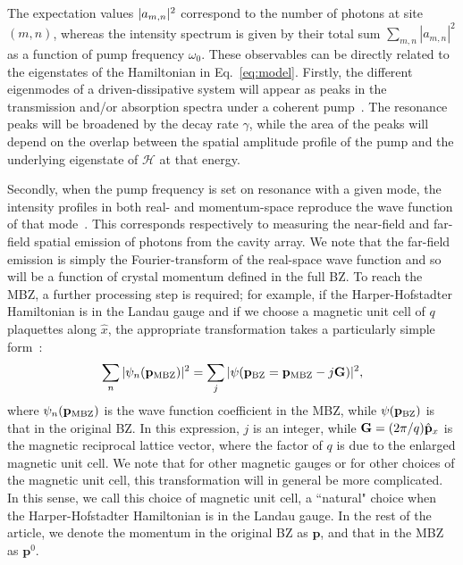 The expectation values $\vert a_{m,n} \vert^2$ correspond to the number of
photons at site $(m,n)$, whereas the intensity spectrum is given by
their total sum $\sum_{m,n} |a_{m,n}|^2$ as a function of pump
frequency $\omega_0$. These observables can be directly related to the
eigenstates of the Hamiltonian in Eq.~\eqref{eq:model}. Firstly, the
different eigenmodes of a driven-dissipative system will appear as
peaks in the transmission and/or absorption spectra under a coherent
pump~\cite{carusotto2013fluids}. The resonance peaks will be broadened
by the decay rate $\gamma$, while the area of the peaks will depend on
the overlap between the spatial amplitude profile of the pump and the
underlying eigenstate of $\mathcal{H}$ at that energy.

Secondly, when the pump frequency is set on resonance with a given
mode, the intensity profiles in both real- and momentum-space
reproduce the wave function of that
mode~\cite{carusotto2013fluids}. This corresponds respectively to
measuring the near-field and far-field spatial emission of photons
from the cavity array. We note that the far-field emission is simply
the Fourier-transform of the real-space wave function and so will be a
function of crystal momentum defined in the full BZ. To reach the MBZ,
a further processing step is required; for example, if the
Harper-Hofstadter Hamiltonian is in the Landau gauge and if we choose
a magnetic unit cell of $q$ plaquettes along $\hat{x}$, the
appropriate transformation takes a particularly simple
form~\cite{price2014magnetic}:
%
\begin{equation} \label{eq:trans} \sum_n
\vert \psi_n(\mathbf{p}_\mathrm{MBZ}) \vert^2 = \sum_j
\vert \psi(\mathbf{p}_\mathrm{BZ} = \mathbf{p}_\mathrm{MBZ}- j\mathbf{G}) \vert^2 ,
\end{equation}
%
where $\psi_n(\mathbf{p}_\mathrm{MBZ})$ is the wave function coefficient
in the MBZ, while $\psi(\mathbf{p}_\mathrm{BZ})$ is that in the original
BZ. In this expression, $j$ is an integer, while $\mathbf{G} = (2\pi/q)
\hat{\mathbf{p}}_x $ is the magnetic reciprocal lattice vector, where the
factor of $q$ is due to the enlarged magnetic unit cell. We note that
for other magnetic gauges or for other choices of the magnetic unit
cell, this transformation will in general be more complicated. In this
sense, we call this choice of magnetic unit cell, a ``natural" choice
when the Harper-Hofstadter Hamiltonian is in the Landau gauge.  In the
rest of the article, we denote the momentum in the original BZ as
$\mathbf{p}$, and that in the MBZ as $\mathbf{p}^0$.

